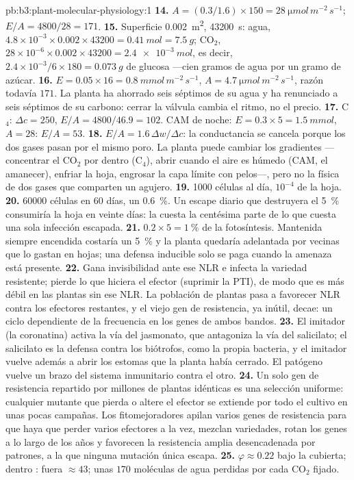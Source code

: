\begin{solution}{pb:b3:plant-molecular-physiology:1}
\textbf{14.} $A = (0.3/1.6)\times 150 = \qty{28}{\micro mol\,m^{-2}\,s^{-1}}$;
$E/A = 4800/28 = 171$.
\textbf{15.} Superficie \qty{0.002}{m^2}, \num{43200}~s: agua, $4.8\times
10^{-3}\times 0.002\times\num{43200} = \qty{0.41}{mol} = \qty{7.5}{g}$;
CO$_{2}$, $28\times 10^{-6}\times 0.002\times\num{43200} =
\qty{2.4e-3}{mol}$, es decir, $2.4\times 10^{-3}/6\times 180 =
\qty{0.073}{g}$ de glucosa ---cien gramos de agua por un gramo de
azúcar.
\textbf{16.} $E = 0.05\times 16 = \qty{0.8}{mmol\,m^{-2}\,s^{-1}}$,
$A = \qty{4.7}{\micro mol\,m^{-2}\,s^{-1}}$, razón todavía $171$. La
planta ha ahorrado seis séptimos de su agua y ha renunciado a seis
séptimos de su carbono: cerrar la válvula cambia el ritmo, no el
precio.
\textbf{17.} C$_{4}$: $\Delta c = 250$, $E/A = 4800/46.9 = 102$. CAM de
noche: $E = 0.3\times 5 = \qty{1.5}{mmol}$, $A = 28$: $E/A = 53$.
\textbf{18.} $E/A = 1.6\,\Delta w/\Delta c$: la conductancia se cancela
porque los dos gases pasan por el mismo poro. La planta puede cambiar
los gradientes ---concentrar el CO$_{2}$ por dentro (C$_{4}$), abrir
cuando el aire es húmedo (CAM, el amanecer), enfriar la hoja, engrosar
la capa límite con pelos---, pero no la física de dos gases que
comparten un agujero.
\textbf{19.} \num{1000} células al día, $10^{-4}$ de la hoja.
\textbf{20.} \num{60000} células en 60 días, un \qty{0.6}{\%}. Un
escape diario que destruyera el \qty{5}{\%} consumiría la hoja en
veinte días: la  cuesta la centésima parte de lo
que cuesta una sola infección escapada.
\textbf{21.} $0.2\times 5 = \qty{1}{\%}$ de la fotosíntesis. Mantenida
siempre encendida costaría un \qty{5}{\%} y la planta quedaría
adelantada por vecinas que lo gastan en hojas; una defensa inducible
solo se paga cuando la amenaza está presente.
\textbf{22.} Gana invisibilidad ante ese NLR e infecta la variedad
resistente; pierde lo que hiciera el efector (suprimir la PTI), de modo
que es más débil en las plantas sin ese NLR. La población de plantas
pasa a favorecer NLR contra los efectores restantes, y el viejo gen de
resistencia, ya inútil, decae: un ciclo dependiente de la frecuencia en
los genes de ambos bandos.
\textbf{23.} El imitador (la coronatina) activa la vía del jasmonato,
que antagoniza la vía del salicilato; el salicilato es la defensa
contra los biótrofos, como la propia bacteria, y el imitador vuelve
además a abrir los estomas que la planta había cerrado. El patógeno
vuelve un brazo del sistema inmunitario contra el otro.
\textbf{24.} Un solo gen de resistencia repartido por millones de
plantas idénticas es una selección uniforme: cualquier mutante que
pierda o altere el efector se extiende por todo el cultivo en unas
pocas campañas. Los fitomejoradores apilan varios genes de resistencia
para que haya que perder varios efectores a la vez, mezclan variedades,
rotan los genes a lo largo de los años y favorecen la resistencia
amplia desencadenada por patrones, a la que ninguna mutación única
escapa.
\textbf{25.} $\varphi \approx 0.22$ bajo la cubierta;  dentro :
fuera $\approx 43$; unas $170$ moléculas de agua perdidas por cada
CO$_{2}$ fijado.
\end{solution}
